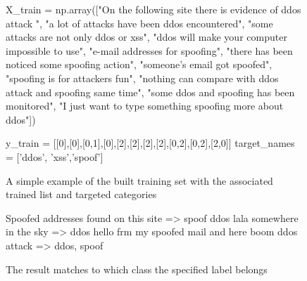 \documentclass[12pt]{article}
\begin{document}
\begin{figure}[h!]
\begin{footnotesize}
\begin{spverbatim}
X_train = np.array(["On the following site there is evidence of ddos attack ",
                    "a lot of attacks have been ddos encountered",
                    "some attacks are not only ddos or xss",
                    "ddos will make your computer impossible to use",
                    "e-mail addresses for spoofing",
                    "there has been noticed some spoofing action",
                    "someone's email got spoofed",
                    "spoofing is for attackers fun",
                    "nothing can compare with ddos attack and spoofing same time",
                    "some ddos and spoofing has been monitored",
                    "I just want to type something spoofing more about ddos"])

y_train = [[0],[0],[0,1],[0],[2],[2],[2],[2],[0,2],[0,2],[2,0]]
target_names = ['ddos', 'xss','spoof']

\end{spverbatim}
\end{footnotesize}
\captionsetup{font=small}
\caption{A simple example of the built training set with the associated trained list and targeted categories }
\label{fig:trainset}
\end{figure}
\begin{figure}[h!]
\begin{footnotesize}
\begin{spverbatim}
Spoofed addresses found on this site => spoof
ddos lala somewhere in the sky => ddos
hello frm my spoofed mail and here boom ddos attack => ddos, spoof
\end{spverbatim}
\end{footnotesize}
\captionsetup{font=small}
\caption{The result matches to which class the specified label belongs}
\label{fig:trainset-result}
\end{figure}

\newpage
\end{document}
